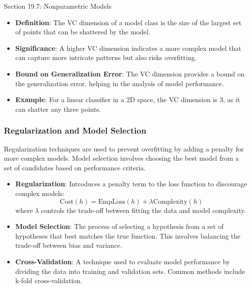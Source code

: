 \begin{notes}{Section 19.7: Nonparametric Models}
\begin{highlight}[VC Dimension]
        \begin{itemize}
            \item \textbf{Definition}: The VC dimension of a model class is the size of the largest set of points that can be shattered by the model.
            \item \textbf{Significance}: A higher VC dimension indicates a more complex model that can capture more intricate patterns but also risks overfitting.
            \item \textbf{Bound on Generalization Error}: The VC dimension provides a bound on the generalization error, helping in the analysis of model performance.
            \item \textbf{Example}: For a linear classifier in a 2D space, the VC dimension is 3, as it can shatter any three points.
        \end{itemize}
    
    \end{highlight}
    
    \subsubsection*{Regularization and Model Selection}
    
    Regularization techniques are used to prevent overfitting by adding a penalty for more complex models. Model selection involves choosing the best model from a set of candidates based on performance 
    criteria.
    
    \begin{highlight}
    
        \begin{itemize}
            \item \textbf{Regularization}: Introduces a penalty term to the loss function to discourage complex models:
            \[
            \text{Cost}(h) = \text{EmpLoss}(h) + \lambda \text{Complexity}(h)
            \]
            where $\lambda$ controls the trade-off between fitting the data and model complexity.
            \item \textbf{Model Selection}: The process of selecting a hypothesis from a set of hypotheses that best matches the true function. This involves balancing the trade-off between bias and variance.
            \item \textbf{Cross-Validation}: A technique used to evaluate model performance by dividing the data into training and validation sets. Common methods include k-fold cross-validation.
        \end{itemize}
    

\end{highlight}
\end{notes}
